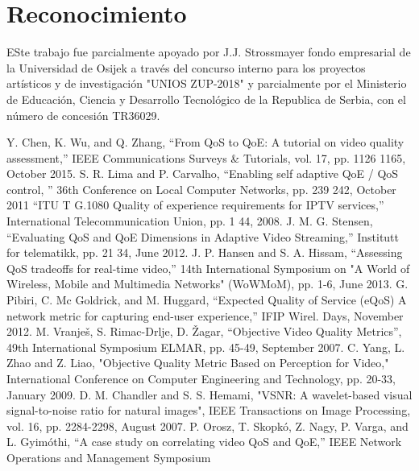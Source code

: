\documentclass[conference]{IEEEtran}
\begin{document}
\section{Reconocimiento}
    ESte trabajo fue parcialmente apoyado por J.J. Strossmayer fondo 
    empresarial de la Universidad de Osijek a través del concurso interno 
    para los proyectos artísticos y de investigación "UNIOS ZUP-2018" y 
    parcialmente por el Ministerio de Educación, Ciencia y Desarrollo 
    Tecnológico de la Republica de Serbia, con el número de concesión 
    TR36029.

\begin{thebibliography}{99}
        Y. Chen, K. Wu, and Q. Zhang, “From QoS to QoE: A tutorial on 
        video quality assessment,” IEEE Communications Surveys \& Tutorials, 
        vol. 17, pp. 1126 1165, October 2015. 
        S. R. Lima and P. Carvalho, “Enabling self adaptive QoE / QoS 
        control, ” 36th Conference on Local Computer Networks, pp. 239 242, 
        October 2011
       “ITU T G.1080 Quality of experience requirements for IPTV services,” 
       International Telecommunication Union, pp. 1 44, 2008.
       J. M. G. Stensen, “Evaluating QoS and QoE Dimensions in Adaptive 
       Video Streaming,” Institutt for telematikk, pp. 21 34, June 2012.
       J. P. Hansen and S. A. Hissam, “Assessing QoS tradeoffs for real-time 
       video,” 14th International Symposium on "A World of Wireless, Mobile 
       and Multimedia Networks" (WoWMoM), pp. 1-6, June 2013.
       G. Pibiri, C. Mc Goldrick, and M. Huggard, “Expected Quality of Service 
       (eQoS) A network metric for capturing end-user experience,” IFIP Wirel. 
       Days, November 2012.
       M. Vranješ, S. Rimac-Drlje, D. Žagar, “Objective Video Quality Metrics”, 
       49th International Symposium ELMAR, pp. 45-49, September 2007.
        C. Yang, L. Zhao and Z. Liao, "Objective Quality Metric Based on 
        Perception for Video," International Conference on Computer Engineering and 
        Technology, pp. 20-33, January 2009. 
        D. M. Chandler and S. S. Hemami, "VSNR: A wavelet-based visual signal-to-noise 
        ratio for natural images", IEEE Transactions on Image Processing, vol. 16, 
        pp. 2284-2298, August 2007.
        P. Orosz, T. Skopkó, Z. Nagy, P. Varga, and L. Gyimóthi, “A case study on 
        correlating video QoS and QoE,” IEEE Network Operations and Management Symposium 

\end{thebibliography}
\end{document}
